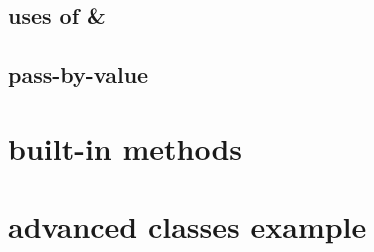 

\subsection{uses of \&}



\subsection{pass-by-value}



\section{built-in methods}



\section{advanced classes example}


